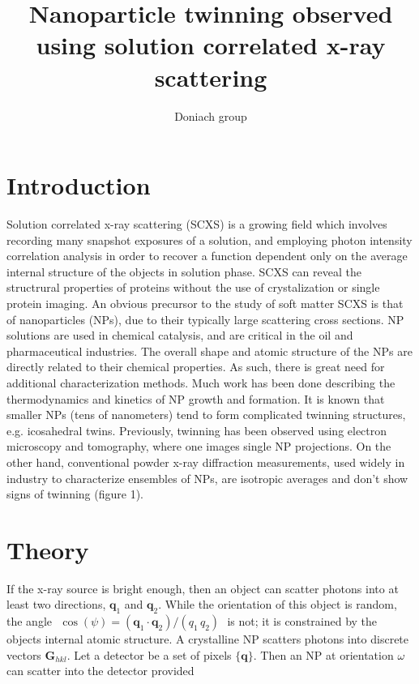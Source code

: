 \documentclass [11pt,fleqn]{article}
\title{Nanoparticle twinning observed using solution correlated x-ray scattering}
\author{Doniach group}
\date{}
\begin{document}
 
\maketitle

\delimitershortfall=-1pt




\section{Introduction}

Solution correlated x-ray scattering (SCXS) is a growing field which involves recording many snapshot exposures of a solution, and employing photon intensity correlation analysis in order to recover a function dependent only on the average internal structure of the objects in solution phase. SCXS can reveal the structrural properties of proteins without the use of crystalization or single protein imaging. An obvious precursor to the study of soft matter SCXS is that of nanoparticles (NPs), due to their typically large scattering cross sections. NP solutions are used in chemical catalysis, and are critical in the oil and pharmaceutical industries. The overall shape and atomic structure of the NPs are directly related to their chemical properties. As such, there is great need for additional characterization methods. Much work has been done describing the thermodynamics and kinetics of NP growth and formation. It is known that smaller NPs (tens of nanometers) tend to form complicated twinning structures, e.g. icosahedral twins. Previously, twinning has been observed using electron microscopy and tomography, where one images single NP projections. On the other hand, conventional powder x-ray diffraction measurements, used widely in industry to characterize ensembles of NPs, are isotropic averages and don't show signs of twinning (figure 1).
 
\section{Theory}
If the x-ray source is bright enough, then an object can scatter photons into at least two directions, $\bm q_1$ and $\bm q_2$. While the orientation of this object is random, the angle $\,\, \cos (\psi) = (\bm q_1 \cdot \bm q_2)/(q_1 \, q_2 )\,\,$ is not; it is constrained by the objects internal atomic structure. A crystalline NP scatters photons into discrete vectors $\bm G_{hkl}$. Let a detector be a set of pixels $\{\bm q\}$. Then an NP at orientation $\omega$ can scatter into the detector provided 
\end{document}
